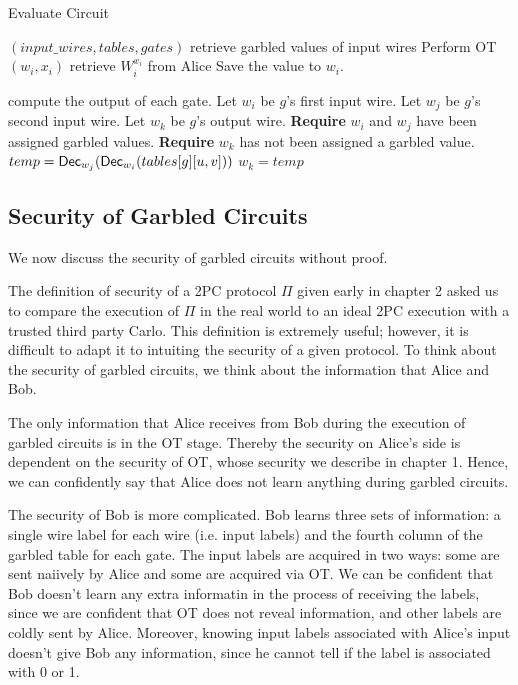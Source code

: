 \begin{algorithm}
\caption{Evaluate Circuit}
\label{alg:evaluate}
\begin{algorithmic}

\Require $(input\_wires, tables, gates)$
	\Comment retrieve garbled values of input wires
	\State Perform OT$(w_i, x_i)$ 
	\Comment retrieve $W^{x_i}_i$ from Alice
	\State Save the value to $w_i$.
\EndFor

	\Comment compute the output of each gate.
	\State Let $w_i$ be $g$'s first input wire.
	\State Let $w_j$ be $g$'s second input wire.
	\State Let $w_k$ be $g$'s output wire.
	\State \textbf{Require} $w_i$ and $w_j$ have been assigned garbled values.
	\State \textbf{Require} $w_k$ has not been assigned a garbled value.
		\State $temp = \textsf{Dec}_{w_j}(\textsf{Dec}_{w_i}(tables[g][u,v]))$
			\State $w_k = temp$
		\EndIf
	\EndFor
\EndFor
\end{algorithmic}
\end{algorithm}

\subsection{Security of Garbled Circuits}
We now discuss the security of garbled circuits without proof.

The definition of security of a 2PC protocol $\Pi$ given early in chapter 2 asked us to compare the execution of $\Pi$ in the real world to an ideal 2PC execution with a trusted third party Carlo.
This definition is extremely useful; however, it is difficult to adapt it to intuiting the security of a given protocol.
To think about the security of garbled circuits, we think about the information that Alice and Bob.

The only information that Alice receives from Bob during the execution of garbled circuits is in the OT stage.
Thereby the security on Alice's side is dependent on the security of OT, whose security we describe in chapter 1.
Hence, we can confidently say that Alice does not learn anything during garbled circuits.

The security of Bob is more complicated.
Bob learns three sets of information: a single wire label for each wire (i.e. input labels)  and the fourth column of the garbled table for each gate.
The input labels are acquired in two ways: some are sent naiively by Alice and some are acquired via OT.
We can be confident that Bob doesn't learn any extra informatin in the process of receiving the labels, since we are confident that OT does not reveal information, and other labels are coldly sent by Alice.
Moreover, knowing input labels associated with Alice's input doesn't give Bob any information, since he cannot tell if the label is associated with 0 or 1.

